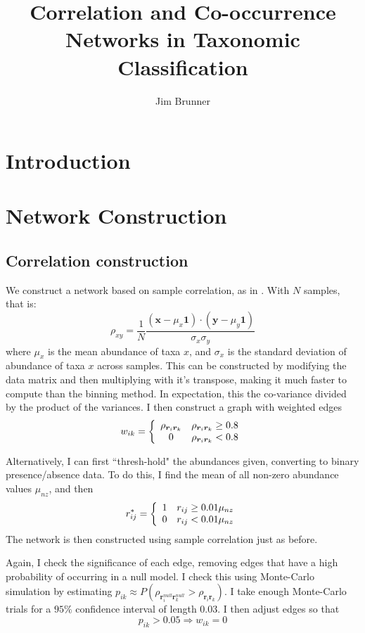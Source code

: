 \documentclass[10pt]{article}
\author{Jim Brunner}
\title{Correlation and Co-occurrence Networks in Taxonomic Classification}
\theoremstyle{definition}
\numberwithin{theorem}{section}
\numberwithin{definition}{section}
\numberwithin{lemma}{section}
\numberwithin{corollary}{section}
\numberwithin{clm}{section}
\numberwithin{rmk}{section}
\renewcommand{\b}{\bm}
\begin{document}
\maketitle

\section{Introduction}
\cite{edge}\cite{gottcha}\cite{ecol_net_rev}\cite{mic_int}\cite{machine_learning}\cite{PhysRevE.70.056131}\cite{PhysRevE.70.066111}\cite{cyotscape}
\section{Network Construction}

\subsection{Correlation construction}
We construct a network based on sample correlation, as in \cite{gut}. With $N$ samples, that is:
\[
\rho_{xy} = \frac{1}{N}\frac{(\b{x}- \mu_x\b{1}) \cdot (\b{y} - \mu_y\b{1})}{\sigma_x \sigma_y}
\]
where $\mu_x$ is the mean abundance of taxa $x$, and $\sigma_x$ is the standard deviation of abundance of taxa $x$ across samples. This can be constructed by modifying the data matrix and then multiplying with it's transpose, making it much faster to compute than the binning method. In expectation, this the co-variance divided by the product of the variances. I then construct a graph with weighted edges
\[
w_{ik} = \left\{\begin{array}{c c}
\rho_{\b{r}_i\b{r}_k} & \rho_{\b{r}_i\b{r}_k}\geq 0.8\\
0 &  \rho_{\b{r}_i\b{r}_k}< 0.8
\end{array}\right.
\]

Alternatively, I can first ``thresh-hold" the abundances given, converting to binary presence/absence data. To do this, I find the mean of all non-zero abundance values $\mu_{nz}$, and then
\[
r^*_{ij} = \left\{\begin{array}{c c}
1 & r_{ij} \geq 0.01\mu_{nz}\\
0 & r_{ij} < 0.01 \mu_{nz}
\end{array}\right.
\]
The network is then constructed using sample correlation just as before.

Again, I check the significance of each edge, removing edges that have a high probability of occurring in a null model. I check this using Monte-Carlo simulation by estimating $p_{ik} \approx P(\rho_{\b{r}_i^{null}\b{r}_k^{null}} > \rho_{\b{r}_i\b{r}_k})$. I take enough Monte-Carlo trials for a $95\%$ confidence interval of length $0.03$. I then adjust edges so that
\[
p_{ik} > 0.05 \Rightarrow w_{ik} = 0
\]
\end{document}
